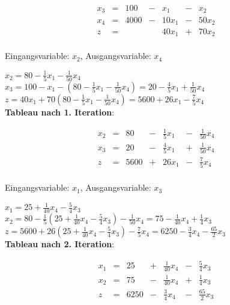 \documentclass[a4paper,11pt]{article}
\newcommand{\bra}[1]{\left(#1\right)}
\begin{document}
\begin{enumerate}
\begin{enumerate}
\begin{enumerate}
            \[\begin{array}{rcrcrcr}
                x_3 & = &  100 & - &   x_1 & - &   x_2 \\
                x_4 & = & 4000 & - & 10x_1 & - & 50x_2 \\ \hline
                  z & = &      &   & 40x_1 & + & 70x_2\\
            \end{array}\]

            Eingangsvariable: $x_2$, Ausgangsvariable: $x_4$

            \( x_2 = 80 - \frac{1}{5}x_1 - \frac{1}{50}x_4 \) \\
            \( x_3 = 100 - x_1 - \bra{80 - \frac{1}{5}x_1 - \frac{1}{50}x_4} = 20 - \frac{4}{5}x_1 + \frac{1}{50}x_4 \)\\
            \( z = 40x_1 + 70\bra{80 - \frac{1}{5}x_1 - \frac{1}{50}x_4} = 5600 + 26x_1 - \frac{7}{5}x_4 \)\\

            \textbf{Tableau nach 1. Iteration}:

            \[\begin{array}{rcrcrcr}
                x_2 & = &   80 & - & \frac{1}{5}x_1 & - & \frac{1}{50}x_4 \\
                x_3 & = &   20 & - & \frac{4}{5}x_1 & + & \frac{1}{50}x_4 \\ \hline
                  z & = & 5600 & + &          26x_1 & - & \frac{7}{5}x_4\\
            \end{array}\]

            Eingangsvariable: $x_1$, Ausgangsvariable: $x_3$

            \( x_1 = 25 + \frac{1}{40}x_4 - \frac{5}{4}x_3 \)\\
            \( x_2 = 80 - \frac{1}{5}\bra{25 + \frac{1}{40}x_4 - \frac{5}{4}x_3} - \frac{1}{50}x_4 = 75 - \frac{1}{40}x_4 + \frac{1}{4}x_3 \)\\
            \( z = 5600 + 26\bra{25 + \frac{1}{40}x_4 - \frac{5}{4}x_3} - \frac{7}{5}x_4 = 6250 - \frac{3}{4}x_4 - \frac{65}{2}x_3 \)\\

            \textbf{Tableau nach 2. Iteration}:

            \[\begin{array}{rcrcrcr}
                x_1 & = &   25 & + & \frac{1}{40}x_4 & - & \frac{5}{4}x_3 \\
                x_2 & = &   75 & - & \frac{1}{40}x_4 & + & \frac{1}{4}x_3 \\ \hline
                  z & = & 6250 & - &  \frac{3}{4}x_4 & - & \frac{65}{2}x_3\\
            \end{array}\]


\end{enumerate}
\end{enumerate}
\end{enumerate}
\end{document}
